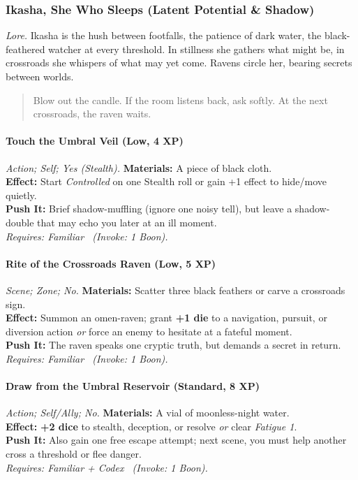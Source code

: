 \subsubsection{Ikasha, She Who Sleeps (Latent Potential \& Shadow)}
\textit{Lore.} Ikasha is the hush between footfalls, the patience of dark water, the black-feathered watcher at every threshold. In stillness she gathers what might be, in crossroads she whispers of what may yet come. Ravens circle her, bearing secrets between worlds.

\begin{quote}
Blow out the candle. If the room listens back, ask softly. At the next crossroads, the raven waits.
\end{quote}

\paragraph{Touch the Umbral Veil (Low, 4 XP)} \emph{Action; Self; Yes (Stealth).}
\textbf{Materials:} A piece of black cloth.\\
\textbf{Effect:} Start \emph{Controlled} on one Stealth roll or gain +1 effect to hide/move quietly.\\
\textbf{Push It:} Brief shadow-muffling (ignore one noisy tell), but leave a shadow-double that may echo you later at an ill moment.\\
\emph{Requires: Familiar \ (\textit{Invoke:} 1 Boon).}

\paragraph{Rite of the Crossroads Raven (Low, 5 XP)} \emph{Scene; Zone; No.}
\textbf{Materials:} Scatter three black feathers or carve a crossroads sign.\\
\textbf{Effect:} Summon an omen-raven; grant \textbf{+1 die} to a navigation, pursuit, or diversion action \emph{or} force an enemy to hesitate at a fateful moment.\\
\textbf{Push It:} The raven speaks one cryptic truth, but demands a secret in return.\\
\emph{Requires: Familiar \ (\textit{Invoke:} 1 Boon).}

\paragraph{Draw from the Umbral Reservoir (Standard, 8 XP)} \emph{Action; Self/Ally; No.}
\textbf{Materials:} A vial of moonless-night water.\\
\textbf{Effect:} \textbf{+2 dice} to stealth, deception, or resolve \emph{or} clear \emph{Fatigue 1}.\\
\textbf{Push It:} Also gain one free escape attempt; next scene, you must help another cross a threshold or flee danger.\\
\emph{Requires: Familiar + Codex \ (\textit{Invoke:} 1 Boon).}

